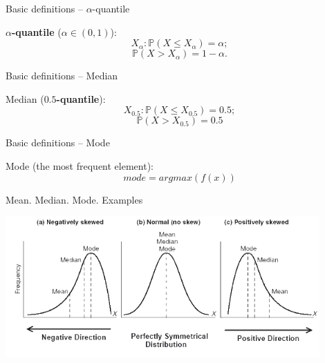 \documentclass{beamer}
\begin{document}

\begin{frame}
{\centerline{Basic definitions -- $\alpha$-quantile}}

\textbf{$\alpha$-quantile} ($\alpha \in (0,1)$):
$$X_\alpha: \mathbb{P}(X \leq X_\alpha) = \alpha;$$
$$\mathbb{P}(X > X_\alpha) = 1 - \alpha.$$


\end{frame}

\begin{frame}
{\centerline{Basic definitions -- Median}}



Median (\textbf{$0.5$-quantile}):
$$X_{0.5}: \mathbb{P}(X \leq X_{0.5}) = 0.5;$$
$$\mathbb{P}(X > X_{0.5}) = 0.5$$

\end{frame}


\begin{frame}
{\centerline{Basic definitions -- Mode}}

Mode (the most frequent element):
$$mode = argmax(f(x))$$ 


\end{frame}



\begin{frame}
{\centerline{Mean. Median. Mode. Examples}}
\begin{center}
\includegraphics[width=12cm]{A2022.FondamentiStatistica/mode3.png}
\end{center} 
\end{frame}


\end{document}

